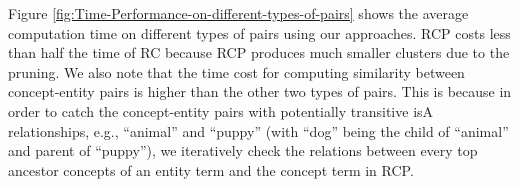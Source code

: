 Figure \ref{fig:Time-Performance-on-different-types-of-pairs} shows
the average computation time on different types of pairs
using our approaches.
RCP costs less than half the time of RC because RCP produces much smaller
clusters due to the pruning. %
We also note that the time cost for computing similarity between
concept-entity pairs is higher than the other two types of pairs.
This is because in order to catch the concept-entity pairs
with potentially transitive isA relationships, e.g., ``animal'' and
``puppy'' (with ``dog'' being the child of ``animal'' and parent
of ``puppy''), we iteratively check the relations between
every top ancestor concepts of an entity term and
the concept term in RCP. %





